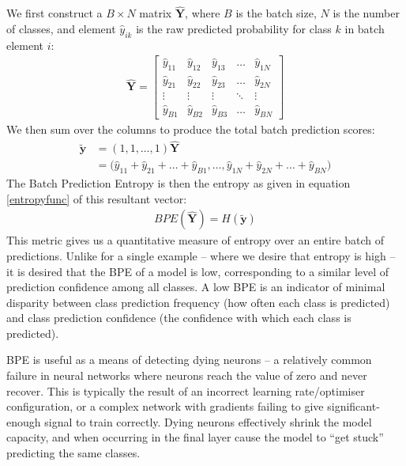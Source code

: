 \documentclass{report}
\begin{document}
We first construct a $B{\times}N$ matrix $\bm{\hat{Y}}$, where $B$ is the batch size, $N$ is the number of classes, and element $\hat{y}_{ik}$ is the raw predicted probability for class $k$ in batch element $i$:
\begin{align} \label{eq:bpe:1}
\bm{\hat{Y}} = \begin{bmatrix}
\hat{y}_{11} & \hat{y}_{12} & \hat{y}_{13} & \dots  & \hat{y}_{1N} \\
\hat{y}_{21} & \hat{y}_{22} & \hat{y}_{23} & \dots  & \hat{y}_{2N} \\
\vdots & \vdots & \vdots & \ddots & \vdots \\
\hat{y}_{B1} & \hat{y}_{B2} & \hat{y}_{B3} & \dots  & \hat{y}_{BN}
\end{bmatrix}
\end{align}
We then sum over the columns to produce the total batch prediction scores:
\begin{align} \label{eq:bpe:2}
\bm{\tilde{y}} &= (1, 1, \dots, 1)\bm{\hat{Y}} \\
  &= \big(\hat{y}_{11} + \hat{y}_{21} + \dots + \hat{y}_{B1}, \dots, \hat{y}_{1N} + \hat{y}_{2N} + \dots + \hat{y}_{BN}\big)
\end{align}
The Batch Prediction Entropy is then the entropy as given in equation \ref{entropyfunc} of this resultant vector:
\begin{align}
BPE(\bm{\hat{Y}}) = H(\bm{\tilde{y}})
\end{align}
This metric gives us a quantitative measure of entropy over an entire batch of predictions. Unlike for a single example -- where we desire that entropy is high -- it is desired that the BPE of a model is low, corresponding to a similar level of prediction confidence among all classes. A low BPE is an indicator of minimal disparity between class prediction frequency (how often each class is predicted) and class prediction confidence (the confidence with which each class is predicted). \par
BPE is useful as a means of detecting dying neurons -- a relatively common failure in neural networks where neurons reach the value of zero and never recover. This is typically the result of an incorrect learning rate/optimiser configuration, or a complex network with gradients failing to give significant-enough signal to train correctly. Dying neurons effectively shrink the model capacity, and when occurring in the final layer cause the model to ``get stuck'' predicting the same classes. \par
\end{document}
